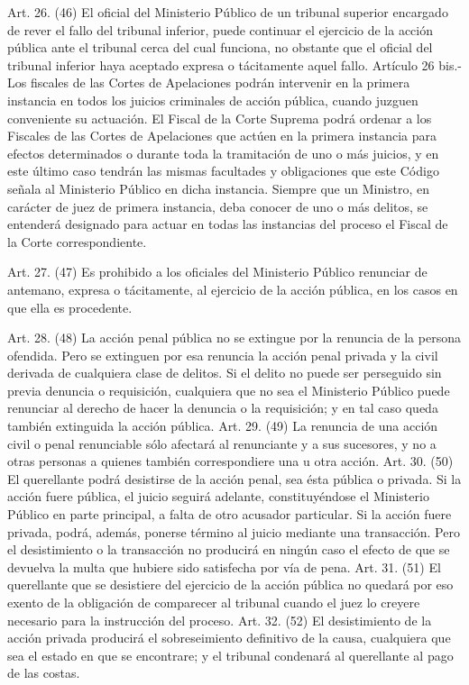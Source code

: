     Art. 26. (46) El oficial del Ministerio Público de un tribunal superior encargado de rever el fallo del tribunal inferior, puede continuar el ejercicio de la acción pública ante el tribunal cerca del cual funciona, no obstante que el oficial del tribunal inferior haya aceptado expresa o tácitamente aquel fallo.
    Artículo 26 bis.- Los fiscales de las Cortes de Apelaciones podrán intervenir en la primera instancia en todos los juicios criminales de acción pública, cuando juzguen conveniente su actuación.
    El Fiscal de la Corte Suprema podrá ordenar a los Fiscales de las Cortes de Apelaciones que actúen en la primera instancia para efectos determinados o durante toda la tramitación de uno o más juicios, y en este último caso tendrán las mismas facultades y obligaciones que este Código señala al Ministerio Público en dicha instancia.
    Siempre que un Ministro, en carácter de juez de primera instancia, deba conocer de uno o más delitos, se entenderá designado para actuar en todas las instancias del proceso el Fiscal de la Corte correspondiente.

    Art. 27. (47) Es prohibido a los oficiales del Ministerio Público renunciar de antemano, expresa o tácitamente, al ejercicio de la acción pública, en los casos en que ella es procedente.

    Art. 28. (48) La acción penal pública no se extingue por la renuncia de la persona ofendida.
    Pero se extinguen por esa renuncia la acción penal privada y la civil derivada de cualquiera clase de delitos.
    Si el delito no puede ser perseguido sin previa denuncia o requisición, cualquiera que no sea el Ministerio Público puede renunciar al derecho de hacer la denuncia o la requisición; y en tal caso queda también extinguida la acción pública.
    Art. 29. (49) La renuncia de una acción civil o penal renunciable sólo afectará al renunciante y a sus sucesores, y no a otras personas a quienes también correspondiere una u otra acción.
    Art. 30. (50) El querellante podrá desistirse de la acción penal, sea ésta pública o privada.
    Si la acción fuere pública, el juicio seguirá adelante, constituyéndose el Ministerio Público en parte principal, a falta de otro acusador particular.
    Si la acción fuere privada, podrá, además, ponerse término al juicio mediante una transacción. Pero el desistimiento o la transacción no producirá en ningún caso el efecto de que se devuelva la multa que hubiere sido satisfecha por vía de pena.
    Art. 31. (51) El querellante que se desistiere del ejercicio de la acción pública no quedará por eso exento de la obligación de comparecer al tribunal cuando el juez lo creyere necesario para la instrucción del proceso.
    Art. 32. (52) El desistimiento de la acción privada producirá el sobreseimiento definitivo de la causa, cualquiera que sea el estado en que se encontrare; y el tribunal condenará al querellante al pago de las costas.


